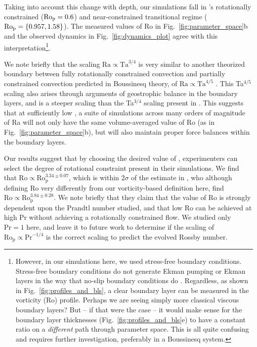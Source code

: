 Taking into account this change with depth,
our simulations fall in \cite{king&all2012}'s rotationally constrained
($\text{Ro}_{\text{p}} = 0.6$) and near-constrained transitional regime ($\text{Ro}_{\text{p}} = \{0.957, 1.58\}$).
The measured values of Ro in Fig.~\ref{fig:parameter_space}b and the observed dynamics
in Fig.~\ref{fig:dynamics_plot} agree with this interpretation\footnote{
However, in our simulations here, we used stress-free boundary conditions.
Stress-free boundary conditions do not generate Ekman pumping or Ekman layers in the way that no-slip boundary conditions do \citep{plumley&all2015}.
Regardless, as shown in Fig.~\ref{fig:profiles_and_bls}, a clear boundary layer can be measured in the vorticity (Ro) profile.
Perhaps we are seeing simply more classical viscous boundary layers?
But -- if that were the case -- it would make sense for the boundary layer thicknesses (Fig.~\ref{fig:profiles_and_bls}e) to have a constant ratio on a \emph{different} path through parameter space.
This is all quite confusing and requires further investigation, preferably in a Boussinesq system.
}.

We note briefly that the scaling $\text{Ra} \propto \text{Ta}^{3/4}$ is very similar to
another theorized boundary between fully rotationally constrained convection and 
partially constrained convection predicted in Boussinesq theory, of 
$\text{Ra} \propto \text{Ta}^{4/5}$ \citep{julien&all2012, gastine&all2016}. This
Ta$^{4/5}$ scaling also arises through arguments of geostrophic balance in the boundary layers,
and is a steeper scaling than the Ta$^{3/4}$ scaling present in \pro.
This suggests that at sufficiently low \pro, a suite of simulations across many orders
of magnitude of Ra will not only have the same volume-averaged value of Ro 
(as in Fig.~\ref{fig:parameter_space}b), but will
also maintain proper force balances within the boundary layers.

Our results suggest that by choosing the desired value of \pro, experimenters
can select the degree of rotational constraint present in their simulations. 
We find that $\text{Ro} \propto \text{Ro}_\text{p}^{3.34 \pm 0.07}$, which is within
2$\sigma$ of the estimate in \cite{king&all2013}, who although defining
Ro very differently from our vorticity-based definition here, find 
$\text{Ro} \propto \text{Ro}_\text{p}^{3.84 \pm 0.28}$. We note briefly that they
claim that the value of $\text{Ro}$ is strongly dependent upon the Prandtl number studied, and
that low Ro can be achieved at high Pr without achieving a rotationally constrained flow.
We studied only $\text{Pr} = 1$ here, and leave it to future work to determine if
the scaling of $\text{Ro}_{\text{p}} \propto \text{Pr}^{-1/4}$ is the correct scaling to
predict the evolved Rossby number.

